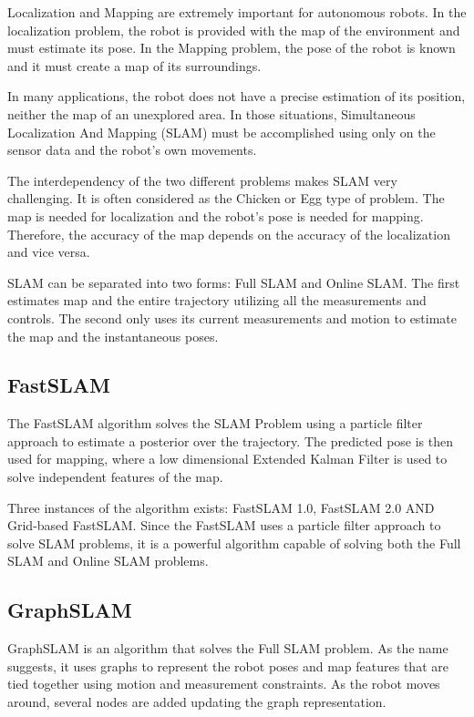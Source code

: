 \documentclass[10pt,journal,compsoc]{IEEEtran}
\begin{document}
Localization and Mapping are extremely important for autonomous robots. In the localization problem, the robot is provided with the map of the environment and must estimate its pose. In the Mapping problem, the pose of the robot is known and it must create a map of its surroundings.

In many applications, the robot does not have a precise estimation of its position, neither the map of an unexplored area. In those situations, Simultaneous Localization And Mapping (SLAM) must be accomplished using only on the sensor data and the robot's own movements.

The interdependency of the two different problems makes SLAM very challenging. It is often considered as the Chicken or Egg type of problem. The map is needed for localization and the robot's pose is needed for mapping. Therefore, the accuracy of the map depends on the accuracy of the localization and vice versa.

SLAM can be separated into two forms: Full SLAM and Online SLAM. The first estimates map and the entire trajectory utilizing all the measurements and controls. The second only uses its current measurements and motion to estimate the map and the instantaneous poses.


\subsection{FastSLAM}

The FastSLAM algorithm solves the SLAM Problem using a particle filter approach to estimate a posterior over the trajectory. The predicted pose is then used for mapping, where a low dimensional Extended Kalman Filter is used to solve independent features of the map.

Three instances of the algorithm exists: FastSLAM 1.0, FastSLAM 2.0 AND Grid-based FastSLAM. Since the FastSLAM uses a particle filter approach to solve SLAM problems, it is a powerful algorithm capable of solving both the Full SLAM and Online SLAM problems.

\subsection{GraphSLAM}
GraphSLAM is an algorithm that solves the Full SLAM problem. As the name suggests, it uses graphs to represent the robot poses and map features that are tied together using motion and measurement constraints. As the robot moves around, several nodes are added updating the graph representation.
\end{document}
